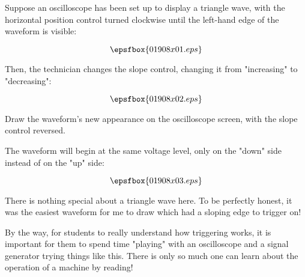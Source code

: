 

Suppose an oscilloscope has been set up to display a triangle wave, with the horizontal position control turned clockwise until the left-hand edge of the waveform is visible:

$$\epsfbox{01908x01.eps}$$

Then, the technician changes the slope control, changing it from "increasing" to "decreasing":

$$\epsfbox{01908x02.eps}$$

Draw the waveform's new appearance on the oscilloscope screen, with the slope control reversed.







The waveform will begin at the same voltage level, only on the "down" side instead of on the "up" side:

$$\epsfbox{01908x03.eps}$$







There is nothing special about a triangle wave here.  To be perfectly honest, it was the easiest waveform for me to draw which had a sloping edge to trigger on!

By the way, for students to really understand how triggering works, it is important for them to spend time "playing" with an oscilloscope and a signal generator trying things like this.  There is only so much one can learn about the operation of a machine by reading!




